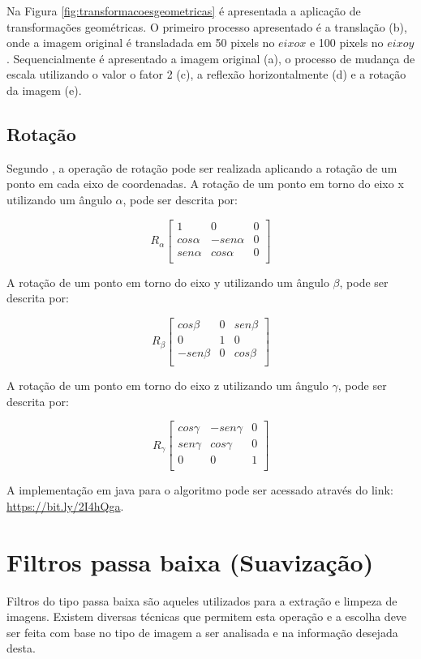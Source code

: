 \documentclass[
	12pt,				%
	oneside,			%
	a4paper,			%
	english,			%
	french,				%
	spanish,			%
	brazil,				%
	]{abntex2}
\begin{document}
Na Figura \ref{fig:transformacoesgeometricas} é apresentada a aplicação de transformações geométricas. O primeiro processo apresentado é a translação (b), onde a imagem original é transladada em 50 pixels no \(eixo x\) e 100 pixels no \(eixo y\). Sequencialmente é apresentado a imagem original (a), o processo de mudança de escala utilizando o valor o fator 2 (c), a reflexão horizontalmente (d) e a rotação da imagem (e). 

\subsection{Rotação}

Segundo \citet{pedriniSchwartz:2008}, a operação de rotação pode ser realizada aplicando a rotação de um ponto em cada eixo de coordenadas. A rotação de um ponto em torno do eixo x utilizando um ângulo \(\alpha\), pode ser descrita por:

\[
R_\alpha
\begin{bmatrix}
         1 &          0 & 0   \\ 
 cos\alpha & -sen\alpha & 0   \\ 
 sen\alpha &  cos\alpha & 0   \\ 
\end{bmatrix} 
\]

A rotação de um ponto em torno do eixo y utilizando um ângulo \(\beta\), pode ser descrita por:

\[
R_\beta
\begin{bmatrix}
     cos\beta & 0 & sen\beta  \\ 
	        0 & 1 & 0         \\ 
	-sen\beta & 0 & cos\beta  \\ 
\end{bmatrix} 
\]

A rotação de um ponto em torno do eixo z utilizando um ângulo \(\gamma\), pode ser descrita por:

\[
R_\gamma
\begin{bmatrix}
    cos\gamma & -sen\gamma & 0  \\ 
	sen\gamma &  cos\gamma & 0  \\ 
	        0 &          0 & 1  \\ 
\end{bmatrix} 
\]

A implementação em java para o algoritmo pode ser acessado através do link: \url{https://bit.ly/2I4hQga}.

\section{Filtros passa baixa (Suavização)}
Filtros do tipo passa baixa são aqueles utilizados para a extração e limpeza de imagens. Existem diversas técnicas que permitem esta operação e a escolha deve ser feita com base no tipo de imagem a ser analisada e na informação desejada desta. 
\end{document}
